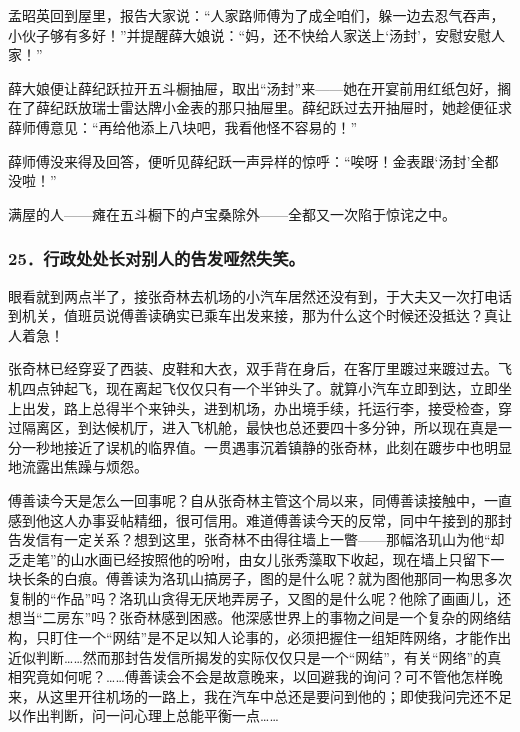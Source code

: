 \par 孟昭英回到屋里，报告大家说：“人家路师傅为了成全咱们，躲一边去忍气吞声，小伙子够有多好！”并提醒薛大娘说：“妈，还不快给人家送上‘汤封’，安慰安慰人家！”
\par 薛大娘便让薛纪跃拉开五斗橱抽屉，取出“汤封”来——她在开宴前用红纸包好，搁在了薛纪跃放瑞士雷达牌小金表的那只抽屉里。薛纪跃过去开抽屉时，她趁便征求薛师傅意见：“再给他添上八块吧，我看他怪不容易的！”
\par 薛师傅没来得及回答，便听见薛纪跃一声异样的惊呼：“唉呀！金表跟‘汤封’全都没啦！”
\par 满屋的人——瘫在五斗橱下的卢宝桑除外——全都又一次陷于惊诧之中。



\subsubsection*{25．行政处处长对别人的告发哑然失笑。}
\par 眼看就到两点半了，接张奇林去机场的小汽车居然还没有到，于大夫又一次打电话到机关，值班员说傅善读确实已乘车出发来接，那为什么这个时候还没抵达？真让人着急！
\par 张奇林已经穿妥了西装、皮鞋和大衣，双手背在身后，在客厅里踱过来踱过去。飞机四点钟起飞，现在离起飞仅仅只有一个半钟头了。就算小汽车立即到达，立即坐上出发，路上总得半个来钟头，进到机场，办出境手续，托运行李，接受检查，穿过隔离区，到达候机厅，进入飞机舱，最快也总还要四十多分钟，所以现在真是一分一秒地接近了误机的临界值。一贯遇事沉着镇静的张奇林，此刻在踱步中也明显地流露出焦躁与烦怨。
\par 傅善读今天是怎么一回事呢？自从张奇林主管这个局以来，同傅善读接触中，一直感到他这人办事妥帖精细，很可信用。难道傅善读今天的反常，同中午接到的那封告发信有一定关系？想到这里，张奇林不由得往墙上一瞥——那幅洛玑山为他“却乏走笔”的山水画已经按照他的吩咐，由女儿张秀藻取下收起，现在墙上只留下一块长条的白痕。傅善读为洛玑山搞房子，图的是什么呢？就为图他那同一构思多次复制的“作品”吗？洛玑山贪得无厌地弄房子，又图的是什么呢？他除了画画儿，还想当“二房东”吗？张奇林感到困惑。他深感世界上的事物之间是一个复杂的网络结构，只盯住一个“网结”是不足以知人论事的，必须把握住一组矩阵网络，才能作出近似判断……然而那封告发信所揭发的实际仅仅只是一个“网结”，有关“网络”的真相究竟如何呢？……傅善读会不会是故意晚来，以回避我的询问？可不管他怎样晚来，从这里开往机场的一路上，我在汽车中总还是要问到他的；即使我问完还不足以作出判断，问一问心理上总能平衡一点……
